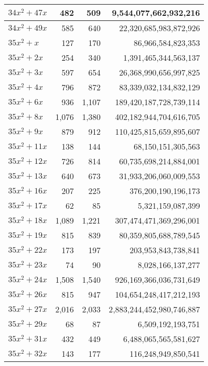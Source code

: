 \documentclass[a4paper]{amsproc}
\theoremstyle{plain}
\theoremstyle{named}
\begin{document}
\begin{longtable}{ | l | r | r | r | }
$34x^2 + 47x$ & 482 & 509 & 9{,}544{,}077{,}662{,}932{,}216 \\ \hline
$34x^2 + 49x$ & 585 & 640 & 22{,}320{,}685{,}983{,}872{,}926 \\ \hline
$35x^2 + x$ & 127 & 170 & 86{,}966{,}584{,}823{,}353 \\ \hline
$35x^2 + 2x$ & 254 & 340 & 1{,}391{,}465{,}344{,}563{,}137 \\ \hline
$35x^2 + 3x$ & 597 & 654 & 26{,}368{,}990{,}656{,}997{,}825 \\ \hline
$35x^2 + 4x$ & 796 & 872 & 83{,}339{,}032{,}134{,}832{,}129 \\ \hline
$35x^2 + 6x$ & 936 & 1{,}107 & 189{,}420{,}187{,}728{,}739{,}114 \\ \hline
$35x^2 + 8x$ & 1{,}076 & 1{,}380 & 402{,}182{,}944{,}704{,}616{,}705 \\ \hline
$35x^2 + 9x$ & 879 & 912 & 110{,}425{,}815{,}659{,}895{,}607 \\ \hline
$35x^2 + 11x$ & 138 & 144 & 68{,}150{,}151{,}305{,}563 \\ \hline
$35x^2 + 12x$ & 726 & 814 & 60{,}735{,}698{,}214{,}884{,}001 \\ \hline
$35x^2 + 13x$ & 640 & 673 & 31{,}933{,}206{,}060{,}009{,}553 \\ \hline
$35x^2 + 16x$ & 207 & 225 & 376{,}200{,}190{,}196{,}173 \\ \hline
$35x^2 + 17x$ & 62 & 85 & 5{,}321{,}159{,}087{,}399 \\ \hline
$35x^2 + 18x$ & 1{,}089 & 1{,}221 & 307{,}474{,}471{,}369{,}296{,}001 \\ \hline
$35x^2 + 19x$ & 815 & 839 & 80{,}359{,}805{,}688{,}789{,}545 \\ \hline
$35x^2 + 22x$ & 173 & 197 & 203{,}953{,}843{,}738{,}841 \\ \hline
$35x^2 + 23x$ & 74 & 90 & 8{,}028{,}166{,}137{,}277 \\ \hline
$35x^2 + 24x$ & 1{,}508 & 1{,}540 & 926{,}169{,}366{,}036{,}731{,}649 \\ \hline
$35x^2 + 26x$ & 815 & 947 & 104{,}654{,}248{,}417{,}212{,}193 \\ \hline
$35x^2 + 27x$ & 2{,}016 & 2{,}033 & 2{,}883{,}244{,}452{,}980{,}746{,}887 \\ \hline
$35x^2 + 29x$ & 68 & 87 & 6{,}509{,}192{,}193{,}751 \\ \hline
$35x^2 + 31x$ & 432 & 449 & 6{,}488{,}065{,}565{,}581{,}627 \\ \hline
$35x^2 + 32x$ & 143 & 177 & 116{,}248{,}949{,}850{,}541 \\ \hline

\end{longtable}
\end{document}
